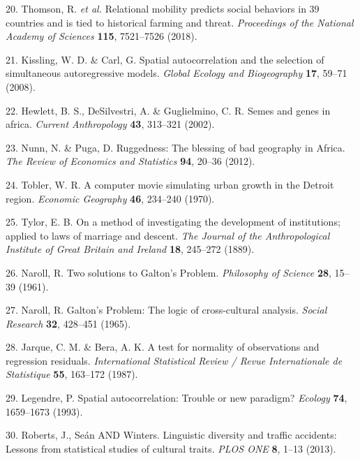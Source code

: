 \documentclass[english,man,floatsintext]{apa6}
\begin{document}
\leavevmode\hypertarget{ref-Thomson2018}{}%
20. Thomson, R. \emph{et al.} Relational mobility predicts social behaviors in 39 countries and is tied to historical farming and threat. \emph{Proceedings of the National Academy of Sciences} \textbf{115}, 7521--7526 (2018).

\leavevmode\hypertarget{ref-Kissling2008}{}%
21. Kissling, W. D. \& Carl, G. Spatial autocorrelation and the selection of simultaneous autoregressive models. \emph{Global Ecology and Biogeography} \textbf{17}, 59--71 (2008).

\leavevmode\hypertarget{ref-Hewlett2002}{}%
22. Hewlett, B. S., DeSilvestri, A. \& Guglielmino, C. R. Semes and genes in africa. \emph{Current Anthropology} \textbf{43}, 313--321 (2002).

\leavevmode\hypertarget{ref-Nunn2012}{}%
23. Nunn, N. \& Puga, D. Ruggedness: The blessing of bad geography in Africa. \emph{The Review of Economics and Statistics} \textbf{94}, 20--36 (2012).

\leavevmode\hypertarget{ref-Tobler1970}{}%
24. Tobler, W. R. A computer movie simulating urban growth in the Detroit region. \emph{Economic Geography} \textbf{46}, 234--240 (1970).

\leavevmode\hypertarget{ref-Tylor1889}{}%
25. Tylor, E. B. On a method of investigating the development of institutions; applied to laws of marriage and descent. \emph{The Journal of the Anthropological Institute of Great Britain and Ireland} \textbf{18}, 245--272 (1889).

\leavevmode\hypertarget{ref-Naroll1961}{}%
26. Naroll, R. Two solutions to Galton's Problem. \emph{Philosophy of Science} \textbf{28}, 15--39 (1961).

\leavevmode\hypertarget{ref-Naroll1965}{}%
27. Naroll, R. Galton's Problem: The logic of cross-cultural analysis. \emph{Social Research} \textbf{32}, 428--451 (1965).

\leavevmode\hypertarget{ref-Jarque1987}{}%
28. Jarque, C. M. \& Bera, A. K. A test for normality of observations and regression residuals. \emph{International Statistical Review / Revue Internationale de Statistique} \textbf{55}, 163--172 (1987).

\leavevmode\hypertarget{ref-Legendre1993}{}%
29. Legendre, P. Spatial autocorrelation: Trouble or new paradigm? \emph{Ecology} \textbf{74}, 1659--1673 (1993).

\leavevmode\hypertarget{ref-Roberts2013}{}%
30. Roberts, J., Seán AND Winters. Linguistic diversity and traffic accidents: Lessons from statistical studies of cultural traits. \emph{PLOS ONE} \textbf{8}, 1--13 (2013).
\end{document}
